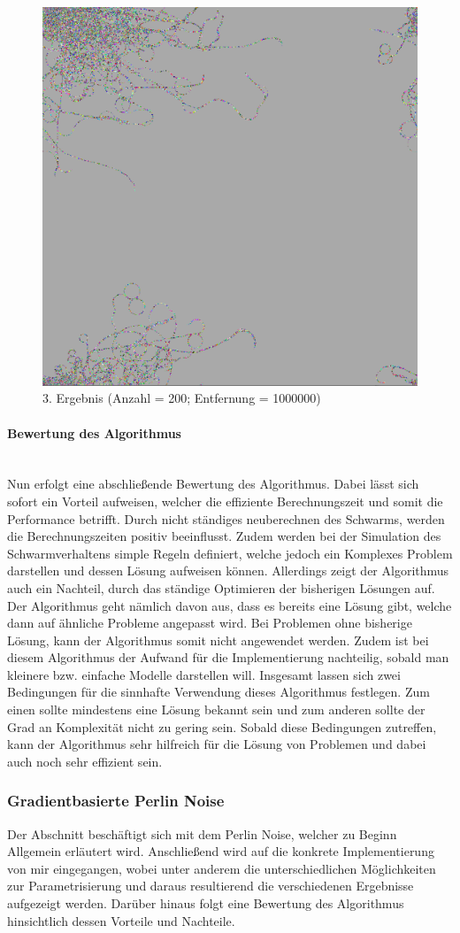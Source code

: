 \documentclass[../mciAusarbeitung.tex]{subfiles}
\begin{document}
\begin{figure}[H]
\centering
\includegraphics[width=0.5\linewidth]{"Flocking_entfernung1000000.png"}
\caption[Flocking-Beispiel3]{3. Ergebnis (Anzahl = 200; Entfernung = 1000000)}
\end{figure} 

            \paragraph{Bewertung des Algorithmus}$~$ \\
            Nun erfolgt eine abschließende Bewertung des Algorithmus. Dabei lässt sich sofort ein Vorteil aufweisen, welcher die effiziente Berechnungszeit und somit die Performance betrifft. Durch nicht ständiges neuberechnen des Schwarms, werden die Berechnungszeiten positiv beeinflusst. Zudem werden bei der Simulation des Schwarmverhaltens simple Regeln definiert, welche jedoch ein Komplexes Problem darstellen und dessen Lösung aufweisen können. 
            Allerdings zeigt der Algorithmus auch ein Nachteil, durch das ständige Optimieren der bisherigen Lösungen auf. Der Algorithmus geht nämlich davon aus, dass es bereits eine Lösung gibt, welche dann auf ähnliche Probleme angepasst wird. Bei Problemen ohne bisherige Lösung, kann der Algorithmus somit nicht angewendet werden. Zudem ist bei diesem Algorithmus der Aufwand für die Implementierung nachteilig, sobald man kleinere bzw. einfache Modelle darstellen will.
            Insgesamt lassen sich zwei Bedingungen für die sinnhafte Verwendung dieses Algorithmus festlegen. Zum einen sollte mindestens eine Lösung bekannt sein und zum anderen sollte der Grad an Komplexität nicht zu gering sein. Sobald diese Bedingungen zutreffen, kann der Algorithmus sehr hilfreich für die Lösung von Problemen und dabei auch noch sehr effizient sein.

        \subsubsection{Gradientbasierte Perlin Noise}
        Der Abschnitt beschäftigt sich mit dem Perlin Noise, welcher zu Beginn Allgemein erläutert wird. Anschließend wird auf die konkrete Implementierung von mir eingegangen, wobei unter anderem die unterschiedlichen Möglichkeiten zur Parametrisierung und daraus resultierend die verschiedenen Ergebnisse aufgezeigt werden. Darüber hinaus folgt eine Bewertung des Algorithmus hinsichtlich dessen Vorteile und Nachteile.
            
\end{document}

